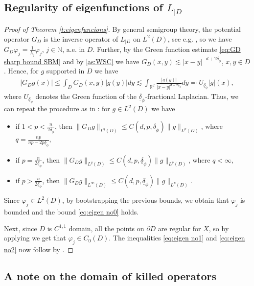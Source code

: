 \documentclass[12pt,a4paper,onecolumn]{article}
\theoremstyle{definition}
\newcommand{\R}{\mathbb{R}}
\newcommand{\N}{\mathbb{N}}
\newcommand{\1}{\mathbf 1}
\newcommand{\ud}[1]{\underline{\delta}_{#1}}
\newcommand{\Lbase}{L_{|D}}
\numberwithin{equation}{section}
\begin{document}
\subsection{Regularity of eigenfunctions of $\Lbase$}\label{ap:GR-reg}
\begin{proof}[Proof of Theorem \ref{t:eigenfuncions}]

		By general semigroup theory, the potential operator $G_D$ is the inverse operator of $\Lbase$ on $L^2(D)$, see e.g. \cite{sato_PO,yosida_FA}, so we have $G_D\varphi_j=\frac{1}{\lambda_j}\varphi_j$, $j\in\N$, a.e. in $D$.	Further, by the Green function estimate
		\eqref{eq:GD sharp bound SBM} and by \ref{as:WSC} we have $G_D(x,y)\lesssim
		|x-y|^{-d+2\ud{\phi}}$, $x,y\in D$. Hence, for $g$ supported in $D$ we have
		\begin{align*}
			|G_Dg(x)|\le \int_D G_D (x,y)|g(y)|dy\lesssim
			\int_{\R^d}\frac{|g(y)|}{|x-y|^{d-2\ud{\phi}}}dy\eqqcolon U_{\ud{\phi}}|g|(x),
		\end{align*}
		where $U_{\ud{\phi}}$ denotes the Green function of the $\ud{\phi}$-fractional Laplacian. Thus, we can repeat the procedure as in \cite[Proposition
		1.2]{Fernandez-RealRos-Oton2014}:  for $g\in L^2(D)$ we have
		\begin{itemize}
			\item if $1<p<\frac{n}{2\ud{\phi}}$, then
			 $\| G_D g \|_{L^q(D)}\le C(d,p,\ud{\phi}) \|g\|_{L^p(D)}$, where $q=\frac{np}{np-2p\ud{\phi}}$, 
			\item 
			if $p=\frac{n}{2\ud{\phi}}$, then
			$\| G_D g \|_{L^q(D)}\le C(d,p,\ud{\phi}) \|g\|_{L^p(D)}$, where $q<\infty,$
			\item 
			
			if $p>\frac{n}{2\ud{\phi}}$, then
			$ \| G_D g \|_{L^\infty(D)}\le C(d,p,\ud{\phi}) \|g\|_{L^p(D)}. $
		\end{itemize}
		Since $\varphi_j\in L^2(D)$, by bootstrapping the previous bounds, we obtain that $\varphi_j$ is bounded and the bound \eqref{eq:eigen no0} holds.
		
		Next, since $D$ is $C^{1,1}$ domain, all the points on $\partial D$ are regular for $X$, so by applying \cite[Lemma 2.2 \& Lemma 2.4]{BVW-na21} we get that $\varphi_j\in C_0(D)$. The
		inequalities \eqref{eq:eigen no1} and \eqref{eq:eigen no2} now follow by
		\cite[Theorem 1.1 \& Theorem 1.2]{KKLL-jfa19}.
\end{proof}
  
 \subsection{A note on the domain of killed operators}\label{ap:domain}
 
\end{document}
